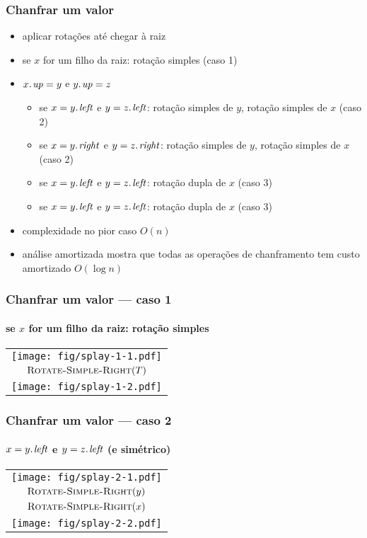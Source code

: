 \documentclass{beamer}
\begin{document}
\begin{frame}
\frametitle{Chanfrar um valor}

\begin{itemize}
\item aplicar rotações até chegar à raiz
\item se $x$ for um filho da raiz: rotação simples (\alert{caso 1})
\item $\attrib{x}{up} = y$ e $\attrib{y}{up} = z$
\begin{itemize}
\item se $x = \attrib{y}{left}$ e $y = \attrib{z}{left}$: rotação simples de $y$, rotação simples de $x$ (\alert{caso 2})
\item se $x = \attrib{y}{right}$ e $y = \attrib{z}{right}$: rotação simples de $y$, rotação simples de $x$  (\alert{caso 2})
\item se $x = \attrib{y}{left}$ e $y = \attrib{z}{left}$: rotação dupla de $x$  (\alert{caso 3})
\item se $x = \attrib{y}{left}$ e $y = \attrib{z}{left}$: rotação dupla de $x$  (\alert{caso 3})
\end{itemize}
\item complexidade no pior caso $O(n)$
\item análise amortizada mostra que todas as operações de chanframento tem
custo amortizado $O(\log n)$
\end{itemize}
\end{frame}

\begin{frame}
\frametitle{Chanfrar um valor --- caso 1}
\framesubtitle{se $x$ for um filho da raiz: rotação simples}

\begin{tabular}{c}
\texttt{[image: fig/splay-1-1.pdf]} \\
$\textnormal{\scshape Rotate-Simple-Right}(T)$ \\
\texttt{[image: fig/splay-1-2.pdf]}
\end{tabular}

\end{frame}

\begin{frame}
\frametitle{Chanfrar um valor --- caso 2}
\framesubtitle{$x = \attrib{y}{left}$ e $y = \attrib{z}{left}$ (e simétrico)}

\begin{tabular}{c}
\texttt{[image: fig/splay-2-1.pdf]} \\
$\textnormal{\scshape Rotate-Simple-Right}(y)$ \\
$\textnormal{\scshape Rotate-Simple-Right}(x)$ \\
\texttt{[image: fig/splay-2-2.pdf]}
\end{tabular}

\end{frame}
\end{document}
